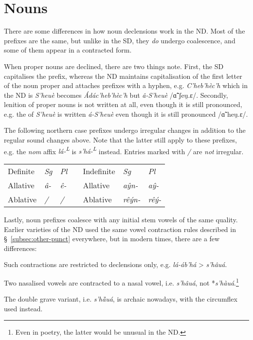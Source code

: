\documentclass[a4paper, 12pt, twoside, openright, final]{book}
\let \nf \normalfont
\def \L {\textsuperscript{L}}
\let \w \textit
\begin{document}
\section{Nouns}
There are some differences in how noun declensions work in the ND. Most of the prefixes are the same, but unlike in the SD,
they \textit{do} undergo coalescence, and some of them appear in a contracted form.

When proper nouns are declined, there are two things note. First, the SD capitalises the prefix, whereas the ND maintains capitalisation
of the first letter of the noun proper and attaches prefixes with a hyphen, e.g. \w{C’heb’hèc’h} which in the ND is \w{S’heuè}
becomes   \w{Ádác’heb’hèc’h} but  \w{â-S’heuè} /ɑ̃̃ˈʃeu̯.ɛ/. Secondly, lenition of proper nouns is not
written at all, even though it is still pronounced, e.g. the  of \w{S’heuè} is written \w{á-S’heuè} even though it is
still pronounced /ɑ̃ˈheu̯.ɛ/.

The following northern case prefixes undergo irregular changes in addition to the regular sound changes above. Note that the
latter still apply to these prefixes, e.g. the \w{nom} affix \w{lá-\L} is \w{s’há-\L} instead. Entries marked with \textit{/}
are \textit{not} irregular.
\noindent\begin{longtable}{l|>{\it}l|>{\it}lll|>{\it}l|>{\it}l}
Definite    &\nf Sg&\nf Pl && Indefinite       &\nf Sg&\nf Pl\\\cline{1-3}\cline{5-7}
Allative         & â-            & ê-       && Allative  & aŷn-       & aŷ-  \\
Ablative         & /             & /        && Ablative  & rêýn-      & rêý-  \\
\end{longtable}

\noindent
Lastly, noun prefixes coalesce with any initial stem vowels of the same quality. Earlier varieties of the ND used the
same vowel contraction rules described in §~\ref{subsec:other-punct} everywhere, but in modern times, there are a few
differences:
\begin{items}
    \item Such contractions are restricted to declensions only, e.g.  \w{lá-áb’há} >  \w{s’hâuá}.
    \item Two nasalised vowels are contracted to a nasal vowel, i.e. \w{s’hâuá}, not *\w{s’hàuá}.\footnote{Even in
        poetry, the latter would be unusual in the ND.}
    \item The double grave variant, i.e. \w{s’hȁuá}, is archaic nowadays, with the circumflex used instead.
\end{items}
\end{document}
